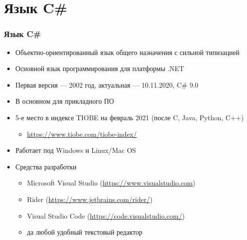 \documentclass[xetex,mathserif,serif]{beamer}
\begin{document}
    \section{Язык C\#}

    \begin{frame}
        \frametitle{Язык C\#}
        \begin{itemize}
            \item Объектно-ориентированный язык общего назначения с сильной типизацией
            \item Основной язык программирования для платформы .NET
            \item Первая версия --- 2002 год, актуальная --- 10.11.2020, C\# 9.0
            \item В основном для прикладного ПО
            \item 5-е место в индексе TIOBE на февраль 2021 (после C, Java, Python, C++)
            \begin{itemize}
                \item \url{https://www.tiobe.com/tiobe-index/}
            \end{itemize}
            \item Работает под Windows и Linux/Mac OS
            \item Средства разработки
            \begin{itemize}
                \item Microsoft Visual Studio (\url{https://www.visualstudio.com})
                \item Rider (\url{https://www.jetbrains.com/rider/})
                \item Visual Studio Code (\url{https://code.visualstudio.com/})
                \item да любой удобный текстовый редактор
            \end{itemize}
        \end{itemize}
    \end{frame}
\end{document}
